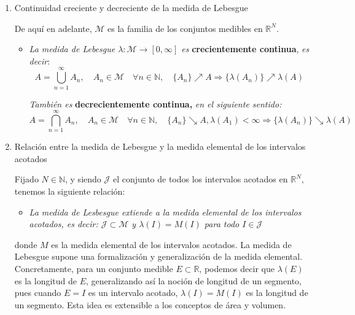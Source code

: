 \documentclass[a4paper, 12pt]{article}
\begin{document}
\begin{enumerate}[label=\textbf{\arabic*}.]
\begin{enumerate}[label=\textit{\alph*})]
\medskip

	\item Continuidad creciente y decreciente de la medida de Lebesgue
	
	De aquí en adelante, \(\mathcal{M}\) es la familia de los conjuntos medibles en \(\mathbb{R}^N\).
	
	\begin{itemize}
		\item \textit{La medida de Lebesgue \(\lambda: \mathcal{M} \to [0, \infty]\) es} \textbf{crecientemente continua}, \textit{es decir}:
		\[
			A = \bigcup_{n=1}^{\infty} A_n, \quad A_n \in \mathcal{M} \quad \forall n \in \mathbb{N}, \quad \{A_n\} \nearrow A \Longrightarrow \{\lambda (A_n)\} \nearrow \lambda(A)
		\]
		
		\textit{También es} \textbf{decrecientemente continua,} \textit{en el siguiente sentido:}
		\[
			A = \bigcap_{n=1}^{\infty} A_n, \quad A_n \in \mathcal{M} \quad \forall n \in \mathbb{N}, \quad \{A_n\} \searrow A, \lambda(A_1) < \infty \Longrightarrow \{\lambda(A_n)\} \searrow \lambda(A)
		\]
	\end{itemize}
	
	\item Relación entre la medida de Lebesgue y la medida elemental de los intervalos acotados
	
	Fijado \(N \in \mathbb{N}\), y siendo \(\mathcal{J}\) el conjunto de todos los intervalos acotados en \(\mathbb{R}^N\), tenemos la siguiente relación:
	
	\begin{itemize}
		\item \textit{La medida de Lesbesgue extiende a la medida elemental de los intervalos acotados, es decir: \(\mathcal{J} \subset \mathcal{M}\) y \(\lambda(I) = M(I)\) para todo \(I \in \mathcal{J}\)}
	\end{itemize}
	
	donde \(M\) es la medida elemental de los intervalos acotados. La medida de Lebesgue supone una formalización y generalización de la medida elemental. Concretamente, para un conjunto medible \(E \subset \mathbb{R}\), podemos decir que \(\lambda (E)\) es la longitud de \(E\), generalizando así la noción de longitud de un segmento, pues cuando \(E = I\) es un intervalo acotado, \(\lambda (I) = M(I)\) es la longitud de un segmento. Esta idea es extensible a los conceptos de área y volumen.

\end{enumerate}

\bigskip


\end{enumerate}
\end{document}
